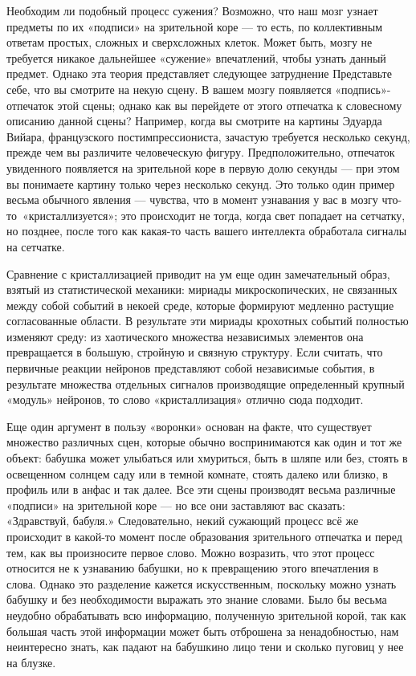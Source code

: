 \documentclass[../main.tex]{subfiles}
\begin{document}
Необходим ли подобный процесс сужения? Возможно, что наш мозг узнает предметы по их «подписи» на зрительной коре --- то есть, по коллективным ответам простых, сложных и сверхсложных клеток. Может быть, мозгу не требуется никакое дальнейшее «сужение» впечатлений, чтобы узнать данный предмет. Однако эта теория представляет следующее затруднение Представьте себе, что вы смотрите на некую сцену. В вашем мозгу появляется «подпись»-отпечаток этой сцены; однако как вы перейдете от этого отпечатка к словесному описанию данной сцены? Например, когда вы смотрите на картины Эдуарда Вийара, французского постимпрессиониста, зачастую требуется несколько секунд, прежде чем вы различите человеческую фигуру. Предположительно, отпечаток увиденного появляется на зрительной коре в первую долю секунды --- при этом вы понимаете картину только через несколько секунд. Это только один пример весьма обычного явления --- чувства, что в момент узнавания у вас в мозгу что-то~«кристаллизуется»; это происходит не тогда, когда свет попадает на сетчатку, но позднее, после того как какая-то часть вашего интеллекта обработала сигналы на сетчатке.

Сравнение с кристаллизацией приводит на ум еще один замечательный образ, взятый из статистической механики: мириады микроскопических, не связанных между собой событий в некоей среде, которые формируют медленно растущие согласованные области. В результате эти мириады крохотных событий полностью изменяют среду: из хаотического множества независимых элементов она превращается в большую, стройную и связную структуру. Если считать, что первичные реакции нейронов представляют собой независимые события, в результате множества отдельных сигналов производящие определенный крупный «модуль» нейронов, то слово «кристаллизация» отлично сюда подходит.

Еще один аргумент в пользу «воронки» основан на факте, что существует множество различных сцен, которые обычно воспринимаются как один и тот же объект: бабушка может улыбаться или хмуриться, быть в шляпе или без, стоять в освещенном солнцем саду или в темной комнате, стоять далеко или близко, в профиль или в анфас и так далее. Все эти сцены производят весьма различные «подписи» на зрительной коре --- но все они заставляют вас сказать: «Здравствуй, бабуля.» Следовательно, некий сужающий процесс всё же происходит в какой-то момент после образования зрительного отпечатка и перед тем, как вы произносите первое слово. Можно возразить, что этот процесс относится не к узнаванию бабушки, но к превращению этого впечатления в слова. Однако это разделение кажется искусственным, поскольку можно узнать бабушку и без необходимости выражать это знание словами. Было бы весьма неудобно обрабатывать всю информацию, полученную зрительной корой, так как большая часть этой информации может быть отброшена за ненадобностью, нам неинтересно знать, как падают на бабушкино лицо тени и сколько пуговиц у нее на блузке.
\end{document}
